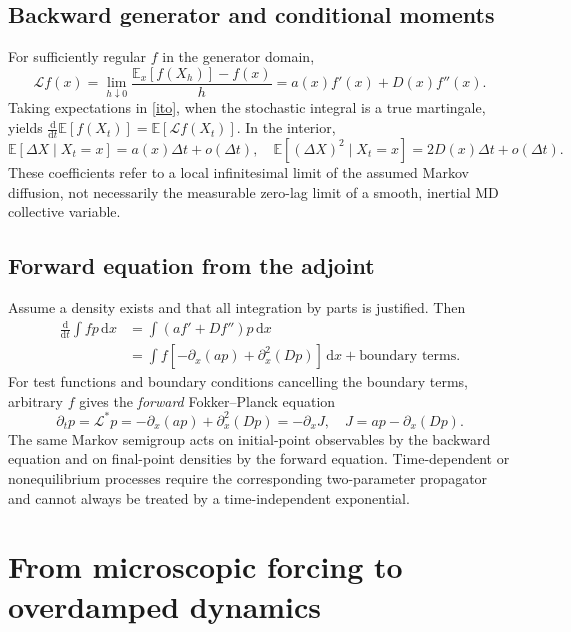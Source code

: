 \documentclass[11pt,a4paper]{article}
\newcommand{\dd}{\mathrm d}
\newcommand{\E}{\mathbb E}
\newcommand{\Lop}{\mathcal L}
\theoremstyle{remark}\newtheorem*{remark}{Physical interpretation}
\begin{document}
\subsection{Backward generator and conditional moments}
For sufficiently regular $f$ in the generator domain,
\begin{equation}\Lop f(x)=\lim_{h\downarrow0}\frac{\E_x[f(X_h)]-f(x)}{h}=a(x)f'(x)+D(x)f''(x).\end{equation}
Taking expectations in \eqref{ito}, when the stochastic integral is a true martingale, yields $\frac{\dd}{\dd t}\E[f(X_t)]=\E[\Lop f(X_t)]$. In the interior,
\begin{equation}\E[\Delta X\mid X_t=x]=a(x)\Delta t+o(\Delta t),\quad
\E[(\Delta X)^2\mid X_t=x]=2D(x)\Delta t+o(\Delta t).\end{equation}
These coefficients refer to a local infinitesimal limit of the assumed Markov diffusion, not necessarily the measurable zero-lag limit of a smooth, inertial MD collective variable.

\subsection{Forward equation from the adjoint}
Assume a density exists and that all integration by parts is justified. Then
\begin{align}\frac{\dd}{\dd t}\int f p\,\dd x
&=\int(af'+Df'')p\,\dd x\\
&=\int f[-\partial_x(ap)+\partial_x^2(Dp)]\,\dd x+\text{boundary terms}.
\end{align}
For test functions and boundary conditions cancelling the boundary terms, arbitrary $f$ gives the \emph{forward} Fokker--Planck equation
\begin{equation}\label{fpe}\boxed{\partial_t p=\Lop^*p=-\partial_x(ap)+\partial_x^2(Dp)=-\partial_xJ,\quad J=ap-\partial_x(Dp).}\end{equation}
The same Markov semigroup acts on initial-point observables by the backward equation and on final-point densities by the forward equation. Time-dependent or nonequilibrium processes require the corresponding two-parameter propagator and cannot always be treated by a time-independent exponential.

\section{From microscopic forcing to overdamped dynamics}
\end{document}
